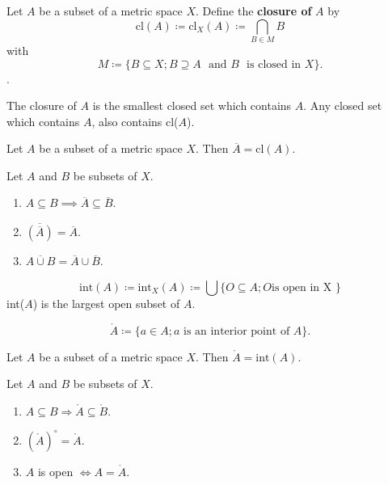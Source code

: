 \begin{definition}
    Let \(A\) be a subset of a metric space \(X\). Define the \textbf{closure of } \(A\) by 
    \[
       \text{cl}(A) \coloneqq \text{cl}_X(A) \coloneqq \bigcap_{B \in M} B   
    \]
    with 
    \[
        M \coloneqq \{B \subseteq X; B \supseteq  A \:\:\: \text{and } B \:\:\: \text{is closed in } X \}.   
    \]. 
\end{definition}
\begin{remark}
    The closure of \(A\) is the smallest closed set which contains \(A\). Any closed set which 
    contains \(A\), also contains cl(\(A\)). 
\end{remark}

\begin{proposition}
    Let \(A\) be a subset of a metric space \(X\). Then \(\overline{A} = \text{cl}\left(A\right)\). 
\end{proposition}

\begin{corollary}
    Let \(A\) and \(B\) be subsets of \(X\). 
    \begin{enumerate}[label=(\roman*)]
        \item \(A \subseteq B \implies \overline{A} \subseteq \overline{B}\). 
        \item \(\overline{\left(\overline{A}\right)} = \overline{A}\). 
        \item \(\overline{A \cup B} = \overline{A} \cup \overline{B}\). 
    \end{enumerate}
\end{corollary}

\begin{definition}
    \[
      \text{int}(A) \coloneqq \text{int}_X (A) \coloneqq \bigcup \{O \subseteq A;O  \text{
        is open in X
      }\}  
    \]
    int(\(A\)) is the largest open subset of \(A\). 
\end{definition}

\begin{definition}
    \[
        \mathring{A} \coloneqq \{ a \in A ; a \text{ is an interior point of } A\}.   
    \]
\end{definition}

\begin{proposition}
    Let \(A\) be a subset of a metric space \(X\). Then \(\mathring{A} = \text{int}\left(A\right)\). 
\end{proposition}

\begin{corollary}
    Let \(A\) and \(B\) be subsets of \(X\). 
    \begin{enumerate}[label=(\roman*)]
        \item \(A \subseteq B \Rightarrow \mathring{A} \subseteq \mathring{B}\). 
        \item \(\left(\mathring{A}\right)^\circ = \mathring{A}\). 
        \item \(A\) is open \(\Leftrightarrow A = \mathring{A}\). 
    \end{enumerate}
\end{corollary}


